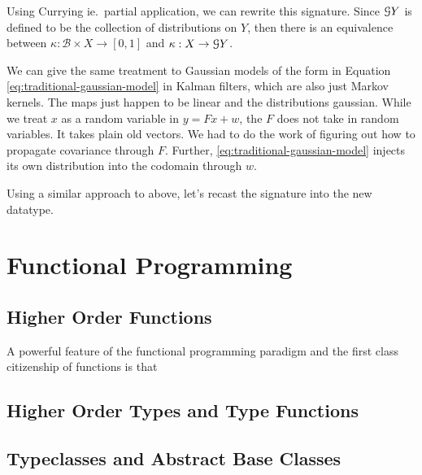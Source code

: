 Using Currying ie.\ partial application, we can rewrite this signature. 
Since $\mathcal{G} Y$ is defined to be the collection of distributions on $Y$, then there is an equivalence between $\kappa : \mathcal{B} \times X \rightarrow [0,1]$ and $\kappa : X \rightarrow \mathcal{G} Y$.

We can give the same treatment to Gaussian models of the form in Equation \ref{eq:traditional-gaussian-model} in Kalman filters, which are also just Markov kernels. The maps just happen to be linear and the distributions gaussian.
While we treat $x$ as a random variable in $y = Fx + w$, the $F$ does not take in random variables.
It takes plain old vectors.
We had to do the work of figuring out how to propagate covariance through $F$.
Further, \ref{eq:traditional-gaussian-model} injects its own distribution into the codomain through $w$.


Using a similar approach to above, let's recast the signature into the new datatype.


\section{Functional Programming}
\subsection{Higher Order Functions}

A powerful feature of the functional programming paradigm and the first class citizenship of functions is that 

\subsection{Higher Order Types and Type Functions}
\subsection{Typeclasses and Abstract Base Classes}

